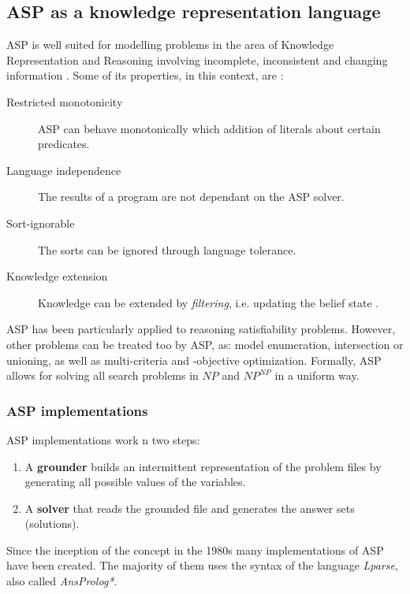 \subsection{ASP as a knowledge representation language}

ASP is well suited for modelling problems in the area of Knowledge Representation and Reasoning involving incomplete, inconsistent and changing information \citep{Schaub13_ASPBoCo}. Some of its properties, in this context, are \citep{Todorova2006_CKASP}:

\begin{description}
\item[Restricted monotonicity] ASP can behave monotonically which addition of literals about certain predicates.
\item[Language independence] The results of a program are not dependant on the ASP solver.
\item[Sort-ignorable] The sorts can be ignored through language tolerance. %
\item[Knowledge extension] Knowledge can be extended by \textit{filtering}, i.e. updating the belief state \citep{Amir2003_LogFil}.
\end{description}

ASP has been particularly applied to reasoning satisfiability problems.
However, other problems can be treated too by ASP, as: model enumeration, intersection or unioning, as well as multi-criteria and -objective optimization. 
Formally, ASP allows for solving all search problems in $NP$ and $NP^{NP}$ in a uniform way. 


\subsubsection{ASP implementations}
ASP implementations work n two steps:

\begin{enumerate}
\item A \textbf{grounder} builds an intermittent representation of the problem files by generating all possible values of the variables.
\item A \textbf{solver} that reads the grounded file and generates the answer sets (solutions).
\end{enumerate}

Since the inception of the concept in the 1980s \citep{Gelf88a} many implementations of ASP have been created.
The majority of them uses the syntax of the language \textit{Lparse}, also called \textit{AnsProlog*}.

